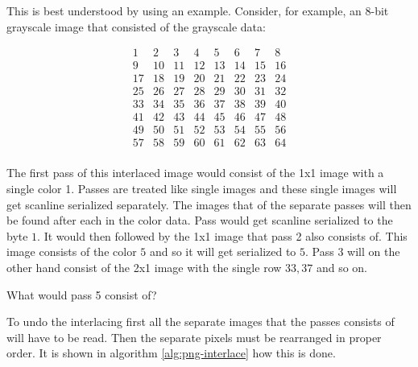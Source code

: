 This is best understood by using an example. Consider, for example, an
8-bit grayscale image that consisted of the grayscale data:

\[
\begin{matrix}
  1 & 2 & 3 & 4 & 5 & 6 & 7 & 8\\
  9 & 10 & 11 & 12 & 13 & 14 & 15 & 16\\
  17 & 18 & 19 & 20 & 21 & 22 & 23 & 24\\
  25 & 26 & 27 & 28 & 29 & 30 & 31 & 32\\
  33 & 34 & 35 & 36 & 37 & 38 & 39 & 40\\
  41 & 42 & 43 & 44 & 45 & 46 & 47 & 48\\
  49 & 50 & 51 & 52 & 53 & 54 & 55 & 56\\
  57 & 58 & 59 & 60 & 61 & 62 & 63 & 64\\

\end{matrix}
\]

The first pass of this interlaced image would consist of the 1x1 image
with a single color 1. Passes are treated like single images and these
single images will get scanline serialized separately. The images that
of the separate passes will then be found after each in the color
data. Pass would get scanline serialized to the byte $1$. It would
then followed by the 1x1 image that pass 2 also consists of. This
image consists of the color $5$ and so it will get serialized to
$5$. Pass 3 will on the other hand consist of the 2x1 image with the
single row $33,37$ and so on.

\begin{Exercise}[label={ex-interlace}]

  What would pass 5 consist of?

\end{Exercise}

To undo the interlacing first all the separate images that the passes
consists of will have to be read. Then the separate pixels must be
rearranged in proper order. It is shown in algorithm
\ref{alg:png-interlace} how this is done.


